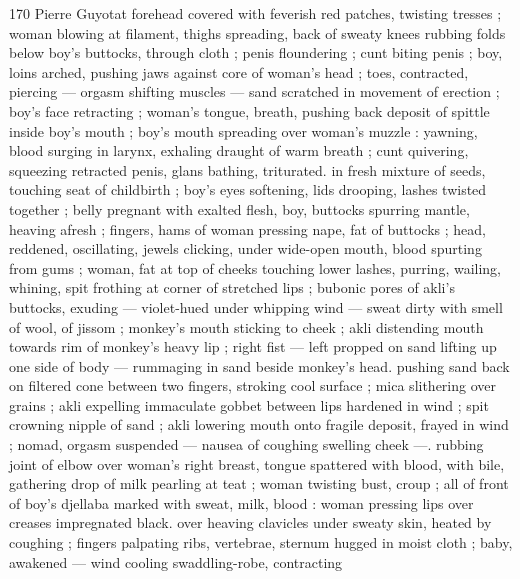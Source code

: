 170 Pierre Guyotat
forehead covered with feverish red patches, twisting tresses ; woman
blowing at filament, thighs spreading, back of sweaty knees rubbing
folds below boy's buttocks, through cloth ; penis floundering ; cunt
biting penis ; boy, loins arched, pushing jaws against core of
woman's head ; toes, contracted, piercing — orgasm shifting
muscles — sand scratched in movement of erection ; boy's face
retracting ; woman's tongue, breath, pushing back deposit of spittle
inside boy's mouth ; boy's mouth spreading over woman's muzzle :
yawning, blood surging in larynx, exhaling draught of warm breath ;
cunt quivering, squeezing retracted penis, glans bathing, triturated.
in fresh mixture of seeds, touching seat of childbirth ; boy's eyes
softening, lids drooping, lashes twisted together ; belly pregnant with
exalted flesh, boy, buttocks spurring mantle, heaving afresh ; fingers,
hams of woman pressing nape, fat of buttocks ; head, reddened,
oscillating, jewels clicking, under wide-open mouth, blood spurting
from gums ; woman, fat at top of cheeks touching lower lashes,
purring, wailing, whining, spit frothing at corner of stretched lips ;
bubonic pores of akli's buttocks, exuding — violet-hued under
whipping wind — sweat dirty with smell of wool, of jissom ;
monkey's mouth sticking to cheek ; akli distending mouth towards
rim of monkey's heavy lip ; right fist — left propped on sand lifting
up one side of body — rummaging in sand beside monkey's head.
pushing sand back on filtered cone between two fingers, stroking
cool surface ; mica slithering over grains ; akli expelling immaculate
gobbet between lips hardened in wind ; spit crowning nipple of sand
; akli lowering mouth onto fragile deposit, frayed in wind ; nomad,
orgasm suspended — nausea of coughing swelling cheek —.
rubbing joint of elbow over woman's right breast, tongue spattered
with blood, with bile, gathering drop of milk pearling at teat ; woman
twisting bust, croup ; all of front of boy's djellaba marked with sweat,
milk, blood : woman pressing lips over creases impregnated black.
over heaving clavicles under sweaty skin, heated by coughing ;
fingers palpating ribs, vertebrae, sternum hugged in moist cloth ;
baby, awakened — wind cooling swaddling-robe, contracting

